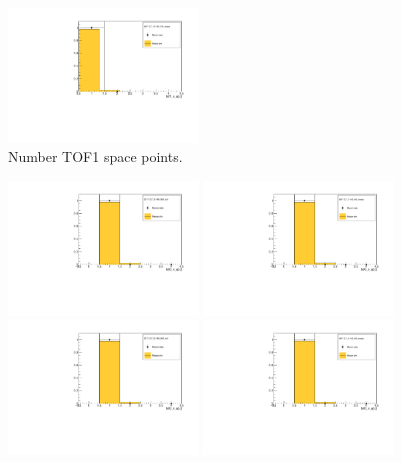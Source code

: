\begin{figure}[!tbh]
    \includegraphics*[width=0.45\textwidth]{02-Cuts/Figures/2017-2.7_10-140_lH2_empty/tof_tof1_n_sp_us_cut.pdf}
    \caption{Number TOF1 space points.
\label{fig:n_tof1_sp}}
\end{figure}

\begin{figure}[!tbh]
    \centering
    \includegraphics*[width=0.45\textwidth]{02-Cuts/Figures/2017-2.7_3-140_lH2_full/tof_tof0_n_sp_us_cut.pdf}
    \includegraphics*[width=0.45\textwidth]{02-Cuts/Figures/2017-2.7_3-140_lH2_empty/tof_tof0_n_sp_us_cut.pdf}
    \includegraphics*[width=0.45\textwidth]{02-Cuts/Figures/2017-2.7_6-140_lH2_full/tof_tof0_n_sp_us_cut.pdf}
    \includegraphics*[width=0.45\textwidth]{02-Cuts/Figures/2017-2.7_6-140_lH2_empty/tof_tof0_n_sp_us_cut.pdf}

\end{figure}
